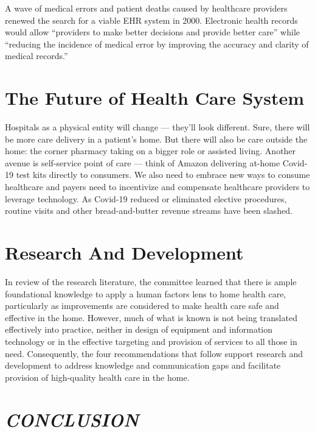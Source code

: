 \documentclass[12pt]{article}
\begin{document}
A wave of medical errors and patient deaths caused by healthcare providers renewed the search for a viable EHR system in 2000. Electronic health records would allow “providers to make better decisions and provide better care” while “reducing the incidence of medical error by improving the accuracy and clarity of medical records.”


\section{The Future of Health Care System}
Hospitals as a physical entity will change — they’ll look different. Sure, there will be more care delivery in a patient’s home. But there will also be care outside the home: the corner pharmacy taking on a bigger role or assisted living. Another avenue is self-service point of care — think of Amazon delivering at-home Covid-19 test kits directly to consumers.\newline\newline 
 We also need to embrace new ways to consume healthcare and payers need to incentivize and compensate healthcare providers to leverage technology. As Covid-19 reduced or eliminated elective procedures, routine visits and other bread-and-butter revenue streams have been slashed.
 
 \section{Research And Development}
 
In review of the research literature, the committee learned that there is ample foundational knowledge to apply a human factors lens to home health care, particularly as improvements are considered to make health care safe and effective in the home. However, much of what is known is not being translated effectively into practice, neither in design of equipment and information technology or in the effective targeting and provision of services to all those in need. \newline
Consequently, the four recommendations that follow support research and development to address knowledge and communication gaps and facilitate provision of high-quality health care in the home.
 
 
\section {\textsl{\textbf{CONCLUSION}}} 
 
\end{document}
